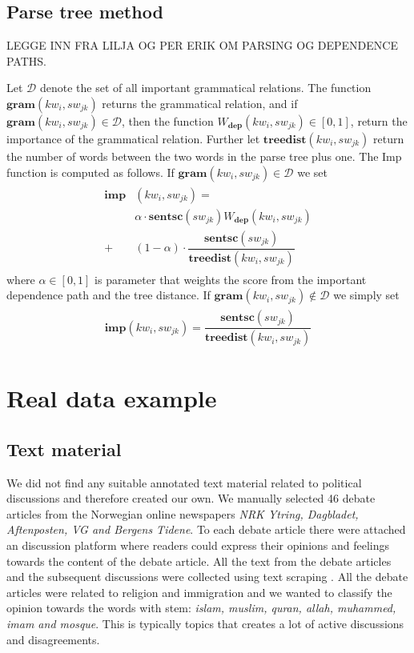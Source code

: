 \documentclass[11pt]{article}
\begin{document}
\subsection{Parse tree method}
\label{sec:dp}

LEGGE INN FRA LILJA OG PER ERIK OM PARSING OG DEPENDENCE PATHS.

Let $\mathcal{D}$ denote the set of all important grammatical relations. The function $\mathbf{gram}(kw_i, sw_{jk})$ returns the grammatical relation, and if $\mathbf{gram}(kw_i, sw_{jk}) \in \mathcal{D}$, then the function $W_{\mathbf{dep}}(kw_i, sw_{jk}) \in [0,1]$, return the importance of the grammatical relation. Further let $\mathbf{treedist}(kw_i, sw_{jk})$ return the number of words between the two words in the parse tree plus one. The Imp function is computed as follows. If $\mathbf{gram}(kw_i, sw_{jk}) \in \mathcal{D}$ we set 
\begin{align}
  \begin{split}
  \mathbf{imp}&(kw_i, sw_{jk}) = \\
  &\alpha \cdot \mathbf{sentsc}(sw_{jk}) W_{\mathbf{dep}}(kw_i, sw_{jk}) \\
  +&(1 - \alpha) \cdot \dfrac{\mathbf{sentsc}(sw_{jk})}{\mathbf{treedist}(kw_i, sw_{jk})}    
  \end{split}
\end{align}
where $\alpha \in [0,1]$ is parameter that weights the score from the important dependence path and the tree distance. If $\mathbf{gram}(kw_i, sw_{jk}) \not\in \mathcal{D}$ we simply set 
\begin{align}
  \begin{split}
  \mathbf{imp}(kw_i, sw_{jk}) = \dfrac{\mathbf{sentsc}(sw_{jk})}{\mathbf{treedist}(kw_i, sw_{jk})}    
  \end{split}
\end{align}

\section{Real data example}
\label{sec:results}

\subsection{Text material}

We did not find any suitable annotated text material related to political discussions and therefore created our own. We manually selected 46 debate articles from the Norwegian online newspapers \textit{NRK Ytring, Dagbladet, Aftenposten, VG and Bergens Tidene}. To each debate article there were attached an discussion platform where readers could express their opinions and feelings towards the content of the debate article. All the text from the debate articles and the subsequent discussions were collected using text scraping \cite{Hammer13}. All the debate articles were related to religion and immigration and we wanted to classify the opinion towards the words with stem: \textit{islam, muslim, quran, allah, muhammed, imam and mosque}. This is typically topics that creates a lot of active discussions and disagreements.
\end{document}
